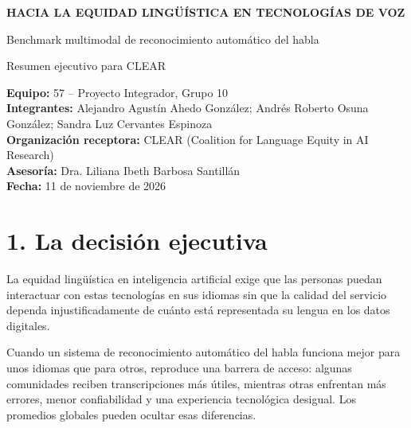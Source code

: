 \documentclass[letterpaper,11pt]{article}
\begin{document}

\begin{center}

{\Large\bfseries\color{azul}
HACIA LA EQUIDAD LINGÜÍSTICA EN TECNOLOGÍAS DE VOZ
}

\vspace{0.2cm}

{\large
Benchmark multimodal de reconocimiento automático del habla
}

\vspace{0.15cm}

{\normalsize
Resumen ejecutivo para CLEAR
}

\end{center}

\vspace{0.3cm}

\noindent
\colorbox{gris}{
\parbox{\dimexpr\linewidth-2\fboxsep\relax}{
\small
\textbf{Equipo:} 57 -- Proyecto Integrador, Grupo 10\\
\textbf{Integrantes:} Alejandro Agustín Ahedo González;
Andrés Roberto Osuna González;
Sandra Luz Cervantes Espinoza\\
\textbf{Organización receptora:} CLEAR
(Coalition for Language Equity in AI Research)\\
\textbf{Asesoría:} Dra. Liliana Ibeth Barbosa Santillán\\
\textbf{Fecha:} 11 de noviembre de 2026
}}

\section*{\color{azul}1. La decisión ejecutiva}

La equidad lingüística en inteligencia artificial exige que
las personas puedan interactuar con estas tecnologías en sus
idiomas sin que la calidad del servicio dependa injustificadamente
de cuánto está representada su lengua en los datos digitales.

Cuando un sistema de reconocimiento automático del habla
funciona mejor para unos idiomas que para otros, reproduce
una barrera de acceso: algunas comunidades reciben
transcripciones más útiles, mientras otras enfrentan más
errores, menor confiabilidad y una experiencia tecnológica
desigual. Los promedios globales pueden ocultar esas diferencias.
\end{document}
